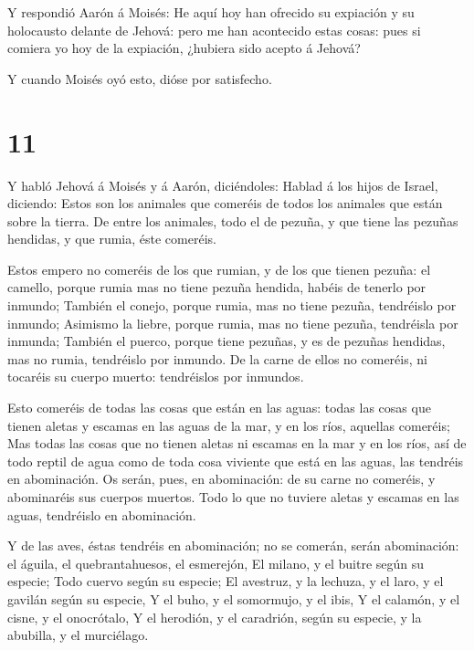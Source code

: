  Y respondió Aarón á Moisés: He aquí hoy han ofrecido su
expiación y su holocausto delante de Jehová: pero me han acontecido
estas cosas: pues si comiera yo hoy de la expiación, ¿hubiera sido
acepto á Jehová?

 Y cuando Moisés oyó esto, dióse por satisfecho.

\hypertarget{section-10}{%
\section{11}\label{section-10}}

 Y habló Jehová á Moisés y á Aarón, diciéndoles:
 Hablad á los hijos de Israel, diciendo: Estos son los
animales que comeréis de todos los animales que están sobre la tierra.
 De entre los animales, todo el de pezuña, y que tiene las
pezuñas hendidas, y que rumia, éste comeréis.

 Estos empero no comeréis de los que rumian, y de los que
tienen pezuña: el camello, porque rumia mas no tiene pezuña hendida,
habéis de tenerlo por inmundo;  También el conejo, porque
rumia, mas no tiene pezuña, tendréislo por inmundo; 
Asimismo la liebre, porque rumia, mas no tiene pezuña, tendréisla por
inmunda;  También el puerco, porque tiene pezuñas, y es de
pezuñas hendidas, mas no rumia, tendréislo por inmundo.  De
la carne de ellos no comeréis, ni tocaréis su cuerpo muerto: tendréislos
por inmundos.

 Esto comeréis de todas las cosas que están en las aguas:
todas las cosas que tienen aletas y escamas en las aguas de la mar, y en
los ríos, aquellas comeréis;  Mas todas las cosas que no
tienen aletas ni escamas en la mar y en los ríos, así de todo reptil de
agua como de toda cosa viviente que está en las aguas, las tendréis en
abominación.  Os serán, pues, en abominación: de su carne
no comeréis, y abominaréis sus cuerpos muertos.  Todo lo
que no tuviere aletas y escamas en las aguas, tendréislo en abominación.

 Y de las aves, éstas tendréis en abominación; no se
comerán, serán abominación: el águila, el quebrantahuesos, el esmerejón,
 El milano, y el buitre según su especie; 
Todo cuervo según su especie;  El avestruz, y la lechuza, y
el laro, y el gavilán según su especie,  Y el buho, y el
somormujo, y el ibis,  Y el calamón, y el cisne, y el
onocrótalo,  Y el herodión, y el caradrión, según su
especie, y la abubilla, y el murciélago.

